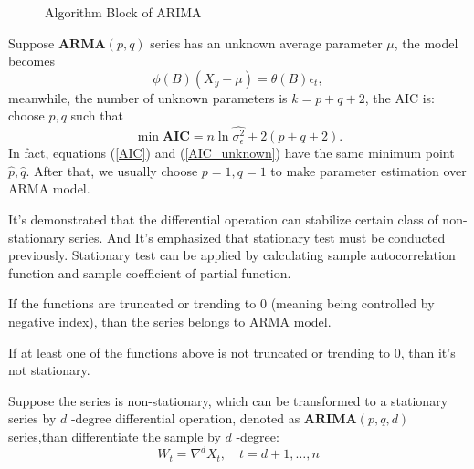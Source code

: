 \documentclass{mcmthesis}
\numberwithin{figure}{section}
\numberwithin{table}{section}
\numberwithin{equation}{section}
\begin{document}
\begin{figure}[ht]
\begin{minipage}[htbp]{0.6\linewidth}
\begin{flushleft}
   \caption{Algorithm Block of ARIMA}\label{ARIMA_ALGO}
  \end{flushleft}
\end{minipage}
\end{figure}



\par
Suppose $ \mathbf{ARMA}(p,q) $ series has an unknown average parameter $ \mu $,
the model becomes
$$
  \phi(B)(X_y-\mu) = \theta(B)\epsilon_t,
$$   
meanwhile, the number of unknown parameters is $ k = p+q+2 $, the AIC is:
choose $ p,q $ such that
\begin{equation}\label{AIC_unknown}
  \min \mathbf{AIC} = n\ln\hat{\sigma_\epsilon^2}+2(p+q+2).
\end{equation}  
In fact, equations (\ref{AIC}) and (\ref{AIC_unknown}) have the same minimum point $ \hat{p},\hat{q} $.
After that, we usually choose $ p = 1, q = 1 $ to make parameter estimation 
over ARMA model.
\par
It's demonstrated that the differential operation can stabilize 
certain class of non-stationary series. And It's emphasized that 
stationary test must be conducted previously. Stationary test can 
be applied by calculating sample autocorrelation function and 
sample coefficient of partial function. 
\par
If the functions are truncated or trending to 0 (meaning being controlled
by negative index), than the series belongs to ARMA model.
\par
If at least one of the functions above is not truncated or trending to 0, than
it's not stationary.
\par
Suppose the series is non-stationary, which can be transformed to 
a stationary series by $ d $ -degree differential operation, denoted
as $ \mathbf{ARIMA}(p,q,d) $ series,than differentiate the sample by
$ d $ -degree:
$$
  W_t = \nabla^dX_t,\quad t = d+1,\dots , n
$$ 
\end{document}
